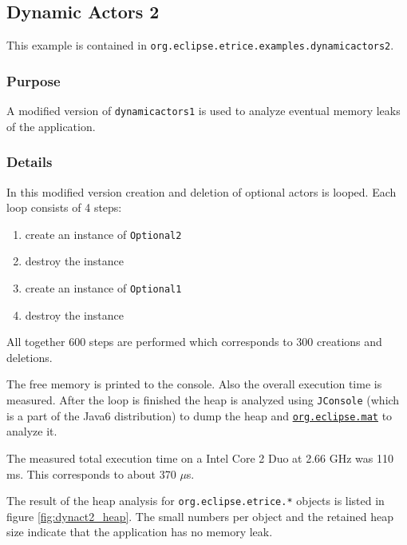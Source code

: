 \subsection{Dynamic Actors 2}

This example is contained in \texttt{org.eclipse.etrice.examples.dynamicactors2}.

\subsubsection{Purpose}

A modified version of \texttt{dynamicactors1} is used to analyze eventual memory leaks of the application.

\subsubsection{Details}

In this modified version creation and deletion of optional actors is looped.
Each loop consists of 4 steps:

\begin{enumerate}
\item create an instance of \texttt{Optional2}
\item destroy the instance
\item create an instance of \texttt{Optional1}
\item destroy the instance
\end{enumerate}

All together 600 steps are performed which corresponds to 300 creations and deletions.

The free memory is printed to the console. Also the overall execution time is measured.
After the loop is finished the heap is analyzed using \texttt{JConsole} (which is a part
of the Java6 distribution) to dump the heap and
\href{http://www.eclipse.org/mat/}{\texttt{org.eclipse.mat}} to analyze it.

The measured total execution time on a Intel Core 2 Duo at 2.66 GHz was 110 ms.
This corresponds to about 370 $\mu$s.

The result of the heap analysis for \texttt{org.eclipse.etrice.*} objects is listed in figure \ref{fig:dynact2_heap}.
The small numbers per object and the retained heap size indicate that the application has no memory leak.

